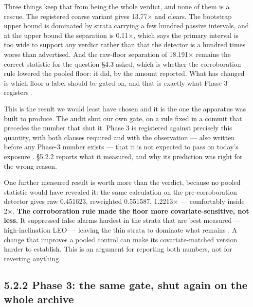 \documentclass[11pt]{article}
\begin{document}
Three things keep that from being the whole verdict, and none of them is a rescue. The registered coarse variant gives 13.77$\times$ and clears. The bootstrap upper bound is dominated by strata carrying a few hundred passive intervals, and at the upper bound the separation is 0.11$\times$, which says the primary interval is too wide to support any verdict rather than that the detector is a hundred times worse than advertised. And the raw-floor separation of 18.191$\times$ remains the correct statistic for the question \S{}4.3 asked, which is whether the corroboration rule lowered the pooled floor: it did, by the amount reported. What has changed is which floor a label should be gated on, and that is exactly what Phase 3 registers%
.

This is the result we would least have chosen and it is the one the apparatus was built to produce. The audit shut our own gate, on a rule fixed in a commit that precedes the number that shut it. Phase 3 is registered against precisely this quantity, with both clauses required and with the observation --- also written before any Phase-3 number exists --- that it is not expected to pass on today's exposure%
. \S{}5.2.2 reports what it measured, and why its prediction was right for the wrong reason.

One further measured result is worth more than the verdict, because no pooled statistic would have revealed it: the same calculation on the pre-corroboration detector gives raw 0.451623, reweighted 0.551587, 1.2213$\times$ --- comfortably inside 2$\times$. \textbf{The corroboration rule made the floor more covariate-sensitive, not less.} It suppressed false alarms hardest in the strata that are best measured --- high-inclination LEO --- leaving the thin strata to dominate what remains%
. A change that improves a pooled control can make its covariate-matched version harder to establish. This is an argument for reporting both numbers, not for reverting anything.

\subsection*{5.2.2 Phase 3: the same gate, shut again on the whole archive}
\end{document}
